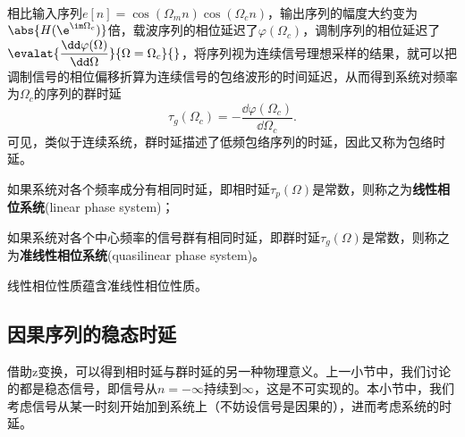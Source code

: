 \begin{example}[群时延]
\begin{align}
    \end{align}
    相比输入序列$e[n]=\cos(\Omega_m n)\cos(\Omega_c n)$，输出序列的幅度大约变为$\abs{H(\e^{\im\Omega_c})}$倍，载波序列的相位延迟了$\varphi(\Omega_c)$，调制序列的相位延迟了$\evalat{\displaystyle\frac{\dd\varphi(\Omega)}{\dd\Omega}}{\Omega=\Omega_c}{}$，将序列视为连续信号理想采样的结果，就可以把调制信号的相位偏移折算为连续信号的包络波形的时间延迟，从而得到系统对频率为$\Omega_c$的序列的群时延
    \begin{equation}
        \tau_g(\Omega_c)=-\frac{\dd\varphi(\Omega_c)}{\dd\Omega_c}.
    \end{equation}
    可见，类似于连续系统，群时延描述了低频包络序列的时延，因此又称为包络时延。
\end{example}

\begin{definition}[离散线性相位系统]
    如果系统对各个频率成分有相同时延，即相时延$\tau_p(\Omega)$是常数，则称之为\textbf{线性相位系统}(linear phase system)；

    如果系统对各个中心频率的信号群有相同时延，即群时延$\tau_g(\Omega)$是常数，则称之为\textbf{准线性相位系统}(quasilinear phase system)。

    线性相位性质蕴含准线性相位性质。
\end{definition}

\subsection{因果序列的稳态时延}\label{sub:causual_static_delay}

借助z变换，可以得到相时延与群时延的另一种物理意义。上一小节中，我们讨论的都是稳态信号，即信号从$n=-\infty$持续到$\infty$，这是不可实现的。本小节中，我们考虑信号从某一时刻开始加到系统上（不妨设信号是因果的），进而考虑系统的时延。

